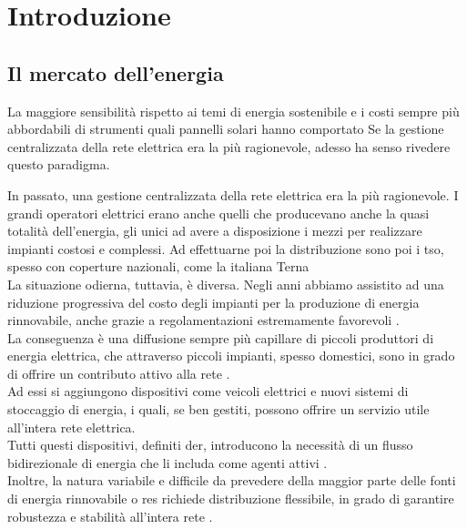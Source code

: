 \chapter{Introduzione}

\section{Il mercato dell'energia}
La maggiore sensibilità rispetto ai temi di energia sostenibile e i costi sempre più abbordabili di strumenti quali pannelli solari hanno comportato 
Se la gestione centralizzata della rete elettrica era la più ragionevole, adesso ha senso rivedere questo paradigma.

In passato, una gestione centralizzata della rete elettrica era la più ragionevole.
I grandi operatori elettrici erano anche quelli che producevano anche la quasi totalità dell'energia, gli unici ad avere a disposizione i mezzi per realizzare impianti costosi e complessi.
Ad effettuarne poi la distribuzione sono poi i \gls{tso}, spesso con coperture nazionali, come la italiana Terna \cite{art:terna-role} \\

La situazione odierna, tuttavia, è diversa.
Negli anni abbiamo assistito ad una riduzione progressiva del costo degli impianti per la produzione di energia rinnovabile, 
anche grazie a regolamentazioni estremamente favorevoli \cite{art:renewable-energy-regulations}. \\

La conseguenza è una diffusione sempre più capillare di piccoli produttori di energia elettrica, 
che attraverso piccoli impianti, spesso domestici, sono in grado di offrire un contributo attivo alla rete \cite{art:renewable-energy-increment}.\\
Ad essi si aggiungono dispositivi come veicoli elettrici e nuovi sistemi di stoccaggio di energia, i quali, se ben gestiti, 
possono offrire un servizio utile all'intera rete elettrica. \\
Tutti questi dispositivi, definiti \gls{der}, introducono la necessità di un flusso bidirezionale di energia che li includa come agenti attivi \cite{art:enel-der}. \\
Inoltre, la natura variabile e difficile da prevedere della maggior parte delle fonti di energia rinnovabile o \gls{res} richiede distribuzione flessibile, 
in grado di garantire robustezza e stabilità all'intera rete \cite{art:blockchain-der}. \\

